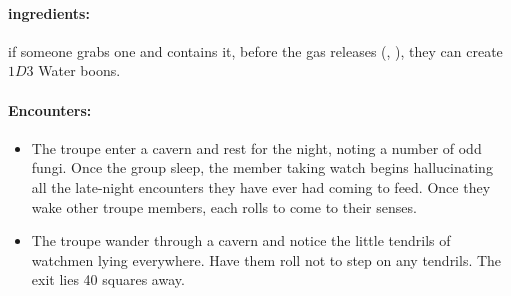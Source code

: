 \begin{multicols}{2}

\watcher

\paragraph{\Glspl{ingredient}:}
if someone grabs one and contains it, before the gas releases (, \tn[10]), they can create $1D3$ Water \glspl{boon}.

\paragraph{Encounters:}

\begin{itemize}

  \item
  The troupe enter a cavern and rest for the night, noting a number of odd fungi.
  Once the group sleep, the member taking watch begins hallucinating all the late-night encounters they have ever had coming to feed.
  Once they wake other troupe members, each rolls to come to their senses.
  \item
  The troupe wander through a cavern and notice the little tendrils of watchmen lying everywhere.
  Have them roll  not to step on any tendrils.
  The exit lies 40 squares away.

\end{itemize}

\end{multicols}

